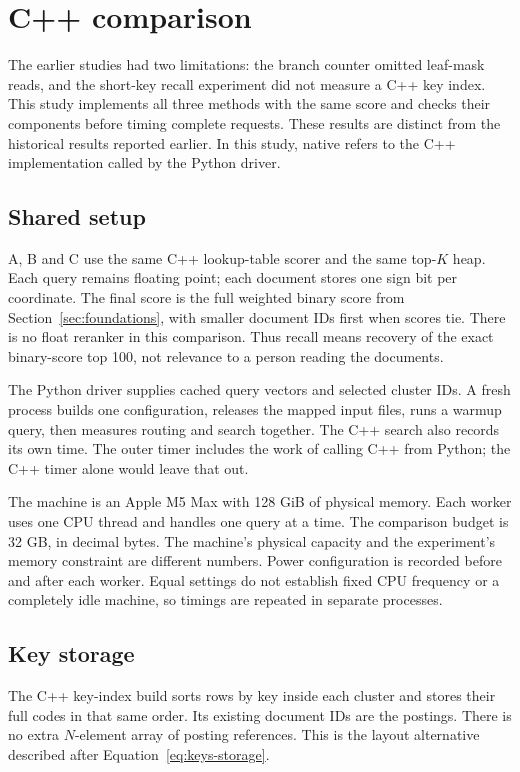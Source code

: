 \section{C++ comparison}
\label{sec:implemented-study}
The earlier studies had two limitations: the branch counter omitted leaf-mask reads, and the
short-key recall experiment did not measure a C++ key index. This study implements all
three methods with the same score and checks their components before timing complete requests.
These results are distinct from the historical results reported earlier. In this study, native
refers to the C++ implementation called by the Python driver.

\subsection{Shared setup}
A, B and C use the same C++ lookup-table scorer and the same top-$K$ heap. Each query remains
floating point; each document stores one sign bit per coordinate. The final score is the full
weighted binary score from Section~\ref{sec:foundations}, with smaller document IDs first when
scores tie. There is no float reranker in this comparison. Thus recall means recovery of the
exact binary-score top 100, not relevance to a person reading the documents.

The Python driver supplies cached query vectors and selected cluster IDs. A fresh process
builds one configuration, releases the mapped input files, runs a warmup query, then measures
routing and search together. The C++ search also records its own time. The outer timer includes
the work of calling C++ from Python; the C++ timer alone would leave that out.

The machine is an Apple M5 Max with 128 GiB of physical memory. Each worker uses one CPU
thread and handles one query at a time. The comparison budget is 32 GB, in decimal bytes.
The machine's physical capacity and the experiment's memory constraint are different numbers.
Power configuration is recorded before and after each worker. Equal settings do not establish
fixed CPU frequency or a completely idle machine, so timings are repeated in separate processes.

\subsection{Key storage}
The C++ key-index build sorts rows by key inside each cluster and stores their full codes in that
same order. Its existing document IDs are the postings. There is no extra $N$-element array of
posting references. This is the layout alternative described after Equation~\eqref{eq:keys-storage}.

